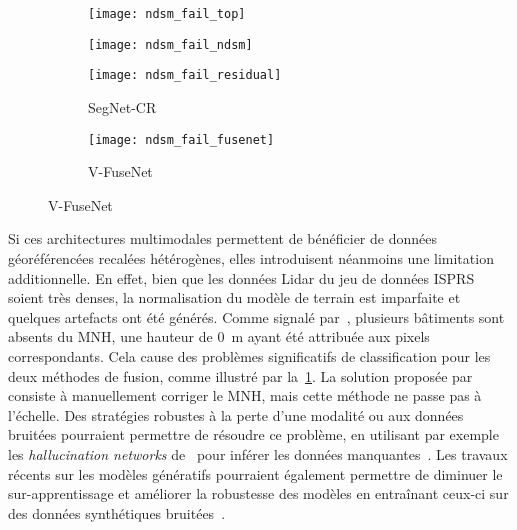 \begin{figure}[h]
	\captionsetup[subfigure]{singlelinecheck=off,justification=centering}
    \captionsetup[subfigure]{labelformat=empty}
    \begin{subfigure}{0.24\textwidth}
    	\texttt{[image: ndsm\_fail\_top]}
        \caption{}
    \end{subfigure}
    \begin{subfigure}{0.24\textwidth}
    	\texttt{[image: ndsm\_fail\_ndsm]}
        \caption{}
    \end{subfigure}
    \begin{subfigure}{0.24\textwidth}
    	\texttt{[image: ndsm\_fail\_residual]}
        \caption{SegNet-CR}
    \end{subfigure}
    \begin{subfigure}{0.24\textwidth}
    	\texttt{[image: ndsm\_fail\_fusenet]}
        \caption{V-FuseNet}
    \end{subfigure}
    \label{fig:ndsm_fail}
\end{figure}

Si ces architectures multimodales permettent de bénéficier de données géoréférencées recalées hétérogènes, elles introduisent néanmoins une limitation additionnelle. En effet, bien que les données \gls{Lidar} du jeu de données \gls{ISPRS} soient très denses, la normalisation du modèle de terrain est imparfaite et quelques artefacts ont été générés. Comme signalé par~\citet{marmanis_classification_2017}, plusieurs bâtiments sont absents du \gls{MNH}, une hauteur de \SI{0}{\meter} ayant été attribuée aux pixels correspondants. Cela cause des problèmes significatifs de classification pour les deux méthodes de fusion, comme illustré par la~\cref{fig:ndsm_fail}. La solution proposée par~\cite{marmanis_classification_2017} consiste à manuellement corriger le \gls{MNH}, mais cette méthode ne passe pas à l'échelle. Des stratégies robustes à la perte d'une modalité ou aux données bruitées pourraient permettre de résoudre ce problème, en utilisant par exemple les \emph{hallucination networks} de~\citet{hoffman_learning_2016} pour inférer les données manquantes~\cite{kampffmeyer_semantic_2016}. Les travaux récents sur les modèles génératifs pourraient également permettre de diminuer le sur-apprentissage et améliorer la robustesse des modèles en entraînant ceux-ci sur des données synthétiques bruitées~\cite{xie_adversarial_2017}.

